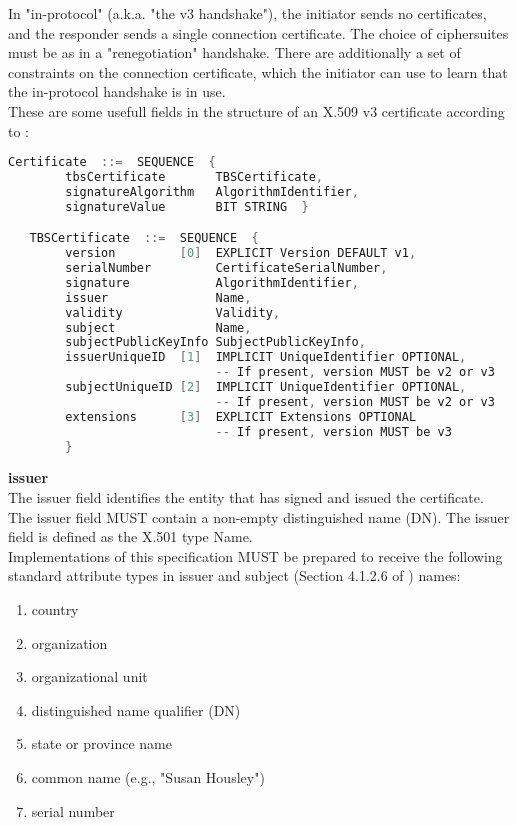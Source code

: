 In "in-protocol" (a.k.a. "the v3 handshake"), the initiator sends no certificates, and the responder sends a single connection certificate.  The choice of ciphersuites must be as in a "renegotiation" handshake.  There are additionally a set of constraints on the connection certificate, which the initiator can use to learn that the in-protocol handshake is in use.
\\
These are some usefull fields in the structure of an X.509 v3 
certificate according to \cite{crl_rfc}:

\begin{lstlisting}[language=c, caption={X.509 v3 Certificate structure}]
Certificate  ::=  SEQUENCE  {
        tbsCertificate       TBSCertificate,
        signatureAlgorithm   AlgorithmIdentifier,
        signatureValue       BIT STRING  }

   TBSCertificate  ::=  SEQUENCE  {
        version         [0]  EXPLICIT Version DEFAULT v1,
        serialNumber         CertificateSerialNumber,
        signature            AlgorithmIdentifier,
        issuer               Name,
        validity             Validity,
        subject              Name,
        subjectPublicKeyInfo SubjectPublicKeyInfo,
        issuerUniqueID  [1]  IMPLICIT UniqueIdentifier OPTIONAL,
                             -- If present, version MUST be v2 or v3
        subjectUniqueID [2]  IMPLICIT UniqueIdentifier OPTIONAL,
                             -- If present, version MUST be v2 or v3
        extensions      [3]  EXPLICIT Extensions OPTIONAL
                             -- If present, version MUST be v3
        }
\end{lstlisting}

\textbf{issuer}
\\
The issuer field identifies the entity that has signed and issued the certificate.  The issuer field MUST contain a non-empty distinguished name (DN).  The issuer field is defined as the X.501 type Name.
\\

Implementations of this specification MUST be prepared to receive the following standard attribute types in issuer and subject (Section 4.1.2.6 of \cite{crl_rfc} ) names:
\begin{enumerate}
	\item country
	\item organization
	\item organizational unit
	\item distinguished name qualifier (DN)
	\item state or province name
	\item common name (e.g., "Susan Housley")
	\item serial number
\end{enumerate}

